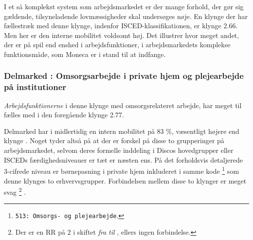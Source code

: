 

I et så komplekst system som arbejdsmarkedet er der mange forhold, der gør sig gældende, tilsyneladende lovmæssigheder skal undersøges nøje. En klynge der har fællestræk med denne klynge, indenfor ISCED-klassifikationen, er klynge 2.66.  Men her er den interne mobilitet voldsomt høj. Det illustrer hvor meget andet, der er på spil end enshed i arbejdsfunktioner, i arbejdsmarkedets komplekse funktionsmåde, som Moneca er i stand til at indfange.

\subsubsection{Delmarked : Omsorgsarbejde i private hjem og plejearbejde på institutioner}

\emph{Arbejdsfunktionerne} i denne klynge med omsorgsrelateret arbejde, har meget til fælles med  i den foregående klynge 2.77. 

Delmarked  har i midlertidig en intern mobilitet på 83 \%, væsentligt højere end klynge . Noget tyder altså på at der er forskel på disse to grupperinger på arbejdsmarkedet, selvom deres formelle inddeling i Discos hovedgrupper eller ISCEDs færdighedsniveauer er tæt er næsten ens. På det forholdsvis detaljerede 3-cifrede niveau er børnepasning i private hjem inkluderet i samme kode%
%
    \footnote{\texttt{513: Omsorgs- og plejearbejde}.}%
%
 som denne klynges to erhvervsgrupper.  Forbindelsen mellem disse to klynger er meget svag%
%
    \footnote{ Der er en RR på 2 i skiftet \emph{fra}  \emph{til} , ellers ingen forbindelse.}%
%
. 




